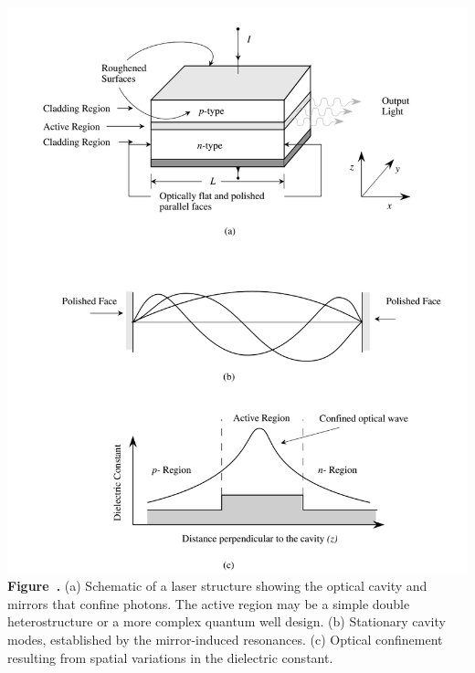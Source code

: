 \begin{center}
	\begin{minipage}{0.90\textwidth}
		\centering
		\includegraphics[width=\textwidth]{img/Laser.png}
		\\[0.5em]
		\textbf{Figure~\thefigure.} (a) Schematic of a laser structure showing the optical cavity and mirrors that confine photons. The active region may be a simple double heterostructure or a more complex quantum well design.
		(b) Stationary cavity modes, established by the mirror-induced resonances.
		(c) Optical confinement resulting from spatial variations in the dielectric constant.
		\label{fig:Laser}
	\end{minipage}
\end{center}

